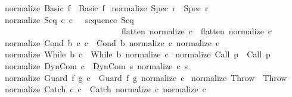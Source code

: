 \begin{isabellebody}
{\isachardoublequoteopen}normalize\ {\isacharparenleft}Basic\ f{\isacharparenright}\ {\isacharequal}\ Basic\ f{\isachardoublequoteclose}\ {\isacharbar}\isanewline
{\isachardoublequoteopen}normalize\ {\isacharparenleft}Spec\ r{\isacharparenright}\ {\isacharequal}\ Spec\ r{\isachardoublequoteclose}\ {\isacharbar}\isanewline
{\isachardoublequoteopen}normalize\ {\isacharparenleft}Seq\ c\ c\ \ {\isacharequal}\ sequence\ Seq\isanewline
\ \ \ \ \ \ \ \ \ \ \ \ \ \ \ \ \ \ \ \ \ \ \ \ \ \ \ \ {\isacharparenleft}{\isacharparenleft}flatten\ {\isacharparenleft}normalize\ c\ {\isacharat}\ {\isacharparenleft}flatten\ {\isacharparenleft}normalize\ c\ {\isacharbar}\isanewline
{\isachardoublequoteopen}normalize\ {\isacharparenleft}Cond\ b\ c\ c\ {\isacharequal}\ Cond\ b\ {\isacharparenleft}normalize\ c\ {\isacharparenleft}normalize\ c\ {\isacharbar}\isanewline
{\isachardoublequoteopen}normalize\ {\isacharparenleft}While\ b\ c{\isacharparenright}\ {\isacharequal}\ While\ b\ {\isacharparenleft}normalize\ c{\isacharparenright}{\isachardoublequoteclose}\ {\isacharbar}\isanewline
{\isachardoublequoteopen}normalize\ {\isacharparenleft}Call\ p{\isacharparenright}\ {\isacharequal}\ Call\ p{\isachardoublequoteclose}\ {\isacharbar}\isanewline
{\isachardoublequoteopen}normalize\ {\isacharparenleft}DynCom\ c{\isacharparenright}\ {\isacharequal}\ DynCom\ {\isacharparenleft}{\isasymlambda}s{\isachardot}\ {\isacharparenleft}normalize\ {\isacharparenleft}c\ s{\isacharparenright}{\isacharparenright}{\isacharparenright}{\isachardoublequoteclose}\ {\isacharbar}\isanewline
{\isachardoublequoteopen}normalize\ {\isacharparenleft}Guard\ f\ g\ c{\isacharparenright}\ {\isacharequal}\ Guard\ f\ g\ {\isacharparenleft}normalize\ c{\isacharparenright}{\isachardoublequoteclose}\ {\isacharbar}\isanewline
{\isachardoublequoteopen}normalize\ Throw\ {\isacharequal}\ Throw{\isachardoublequoteclose}\ {\isacharbar}\isanewline
{\isachardoublequoteopen}normalize\ {\isacharparenleft}Catch\ c\ c\ {\isacharequal}\ Catch\ {\isacharparenleft}normalize\ c\ {\isacharparenleft}normalize\ c\isanewline

\end{isabellebody}
